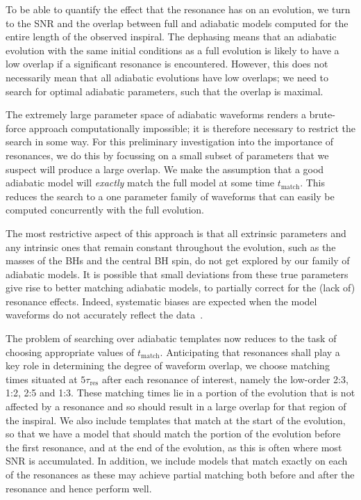 \documentclass[aps,prd,amsfonts,amssymb,amsmath,nofootinbib,showpacs,superscriptaddress,twocolumn]{revtex4}
\begin{document}
To be able to quantify the effect that the resonance has on an evolution, we turn to the SNR and the overlap between full and adiabatic models computed for the entire length of the observed inspiral. The dephasing means that an adiabatic evolution with the same initial conditions as a full evolution is likely to have a low overlap if a significant resonance is encountered. However, this does not necessarily mean that all adiabatic evolutions have low overlaps; we need to search for optimal adiabatic parameters, such that the overlap is maximal.

The extremely large parameter space of adiabatic waveforms renders a brute-force approach computationally impossible; it is therefore necessary to restrict the search in some way. For this preliminary investigation into the importance of resonances, we do this by focussing on a small subset of parameters that we suspect will produce a large overlap. We make the assumption that a good adiabatic model will \emph{exactly} match the full model at some time $t_{\mathrm{match}}$. This reduces the search to a one parameter family of waveforms that can easily be computed concurrently with the full evolution.

The most restrictive aspect of this approach is that all extrinsic parameters and any intrinsic ones that remain constant throughout the evolution, such as the masses of the BHs and the central BH spin, do not get explored by our family of adiabatic models. It is possible that small deviations from these true parameters give rise to better matching adiabatic models, to partially correct for the (lack of) resonance effects. Indeed, systematic biases are expected when the model waveforms do not accurately reflect the data~\cite{Cutler2007}.

The problem of searching over adiabatic templates now reduces to the task of choosing appropriate values of $t_{\mathrm{match}}$. Anticipating that resonances shall play a key role in determining the degree of waveform overlap, we choose matching times situated at $5\tau_\mathrm{res}$ after each resonance of interest, namely the low-order 2:3, 1:2, 2:5 and 1:3. These matching times lie in a portion of the evolution that is not affected by a resonance and so should result in a large overlap for that region of the inspiral. We also include templates that match at the start of the evolution, so that we have a model that should match the portion of the evolution before the first resonance, and at the end of the evolution, as this is often where most SNR is accumulated. In addition, we include models that match exactly on each of the resonances as these may achieve partial matching both before and after the resonance and hence perform well.
\end{document}
